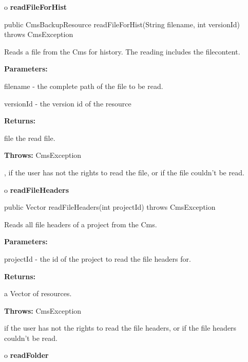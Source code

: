 o {\bf readFileForHist} 

\begin{PRE}
 public CmsBackupResource readFileForHist(String filename,
                                          int versionId) throws CmsException
\end{PRE}

\begin{description}
\htmlDD Reads a file from the Cms for history. \htmlBR
The reading includes the filecontent. 

\begin{description}
\item {\bf Parameters:}  

filename - the complete path of the file to be read.  

versionId - the version id of the resource  
\item {\bf Returns:}  

file the read file.  
\item {\bf Throws:} CmsException  

, if the user has not the rights to read the file, or if the file couldn't be
read.  
\end{description}

\end{description}

o {\bf readFileHeaders} 

\begin{PRE}
 public Vector readFileHeaders(int projectId) throws CmsException
\end{PRE}

\begin{description}
\htmlDD Reads all file headers of a project from the Cms. 

\begin{description}
\item {\bf Parameters:}  

projectId - the id of the project to read the file headers for.  
\item {\bf Returns:}  

a Vector of resources.  
\item {\bf Throws:} CmsException  

if the user has not the rights to read the file headers, or if the file
headers couldn't be read.  
\end{description}

\end{description}

o {\bf readFolder} 

